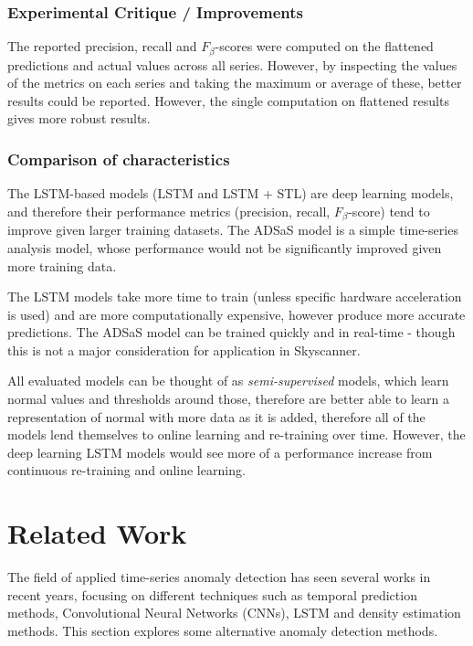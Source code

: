 \documentclass{mpaper}
\begin{document}
\subsubsection{Experimental Critique / Improvements}

The reported precision, recall and $F_\beta$-scores were computed on the flattened predictions and actual values across all series. However, by inspecting the values of the metrics on each series and taking the maximum or average of these, better results could be reported. However, the single computation on flattened results gives more robust results.

\subsubsection{Comparison of characteristics}

The LSTM-based models (LSTM and LSTM + STL) are deep learning models, and therefore their performance metrics (precision, recall, $F_\beta$-score) tend to improve given larger training datasets. The ADSaS model is a simple time-series analysis model, whose performance would not be significantly improved given more training data.

The LSTM models take more time to train (unless specific hardware acceleration is used) and are more computationally expensive, however produce more accurate predictions. The ADSaS model can be trained quickly and in real-time - though this is not a major consideration for application in Skyscanner.

All evaluated models can be thought of as \textit{semi-supervised} models, which learn normal values and thresholds around those, therefore are better able to learn a representation of normal with more data as it is added, therefore all of the models lend themselves to online learning and re-training over time. However, the deep learning LSTM models would see more of a performance increase from continuous re-training and online learning.

\section{Related Work}

The field of applied time-series anomaly detection has seen several works in recent years, focusing on different techniques such as temporal prediction methods, Convolutional Neural Networks (CNNs), LSTM and density estimation methods. This section explores some alternative anomaly detection methods.
\end{document}
